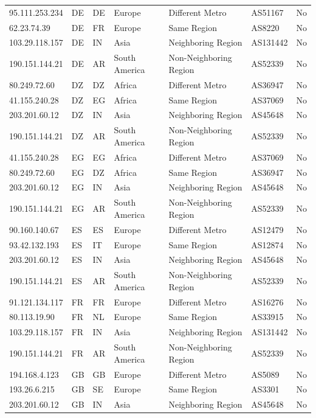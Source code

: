 \begin{table}[h]
\begin{tabular}{|l|l|l|l|l|l|c|}
		\hline
		95.111.253.234 & DE & DE & Europe & Different Metro & AS51167 & No \\
		62.23.74.39 & DE & FR & Europe & Same Region & AS8220 & No \\
		103.29.118.157 & DE & IN & Asia & Neighboring Region & AS131442 & No \\
		190.151.144.21 & DE & AR & South America & Non-Neighboring Region & AS52339 & No \\
		\hline
		80.249.72.60 & DZ & DZ & Africa & Different Metro & AS36947 & No \\
		41.155.240.28 & DZ & EG & Africa & Same Region & AS37069 & No \\
		203.201.60.12 & DZ & IN & Asia & Neighboring Region & AS45648 & No \\
		190.151.144.21 & DZ & AR & South America & Non-Neighboring Region & AS52339 & No \\
		\hline
		41.155.240.28 & EG & EG & Africa & Different Metro & AS37069 & No \\
		80.249.72.60 & EG & DZ & Africa & Same Region & AS36947 & No \\
		203.201.60.12 & EG & IN & Asia & Neighboring Region & AS45648 & No \\
		190.151.144.21 & EG & AR & South America & Non-Neighboring Region & AS52339 & No \\
		\hline
		90.160.140.67 & ES & ES & Europe & Different Metro & AS12479 & No \\
		93.42.132.193 & ES & IT & Europe & Same Region & AS12874 & No \\
		203.201.60.12 & ES & IN & Asia & Neighboring Region & AS45648 & No \\
		190.151.144.21 & ES & AR & South America & Non-Neighboring Region & AS52339 & No \\
		\hline
		91.121.134.117 & FR & FR & Europe & Different Metro & AS16276 & No \\
		80.113.19.90 & FR & NL & Europe & Same Region & AS33915 & No \\
		103.29.118.157 & FR & IN & Asia & Neighboring Region & AS131442 & No \\
		190.151.144.21 & FR & AR & South America & Non-Neighboring Region & AS52339 & No \\
		\hline
		194.168.4.123 & GB & GB & Europe & Different Metro & AS5089 & No \\
		193.26.6.215 & GB & SE & Europe & Same Region & AS3301 & No \\
		203.201.60.12 & GB & IN & Asia & Neighboring Region & AS45648 & No \\

\end{tabular}
\end{table}
